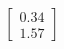 \documentclass[preview]{standalone}
\begin{document}
\begin{align*}
\begin{bmatrix} 0.34 \\ 1.57 \end{bmatrix}
\end{align*}
\end{document}
